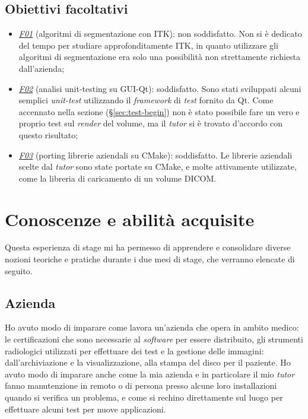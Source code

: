 \subsection{Obiettivi facoltativi}
\begin{itemize}
	 \item \underline{\textit{F01}} (algoritmi di segmentazione con ITK): non soddisfatto. Non si è dedicato del tempo per studiare approfonditamente ITK, in quanto utilizzare gli algoritmi di segmentazione era solo una possibilità non strettamente richiesta dall'azienda;
	 \item \underline{\textit{F02}} (analisi unit-testing su GUI-Qt): soddisfatto. Sono stati sviluppati alcuni semplici \emph{unit-test} utilizzando il \emph{framework} di \emph{test} fornito da Qt. Come accennato nella sezione  (§\ref{sec:test-begin}) non è stato possibile fare un vero e proprio test sul \emph{render} del volume, ma il \emph{tutor} si è trovato d'accordo con questo risultato;
	 \item \underline{\textit{F03}} (porting librerie aziendali su CMake): soddisfatto. Le librerie aziendali scelte dal \emph{tutor} sono state portate su CMake, e molte attivamente utilizzate, come la libreria di caricamento di un volume DICOM.
\end{itemize}

\section{Conoscenze e abilità acquisite}
Questa esperienza di stage mi ha permesso di apprendere e consolidare diverse nozioni teoriche e pratiche durante i due mesi di stage, che verranno elencate di seguito.

\subsection{Azienda}
Ho avuto modo di imparare come lavora un'azienda che opera in ambito medico: le certificazioni che sono necessarie al \emph{software} per essere distribuito, gli strumenti radiologici utilizzati per effettuare dei test e la gestione delle immagini: dall'archiviazione e la visualizzazione, alla stampa del disco per il paziente. Ho avuto modo di imparare anche come la mia azienda e in particolare il mio \emph{tutor} fanno manutenzione in remoto o di persona presso alcune loro installazioni quando si verifica un problema, e come si rechino direttamente sul luogo per effettuare alcuni test per nuove applicazioni.

